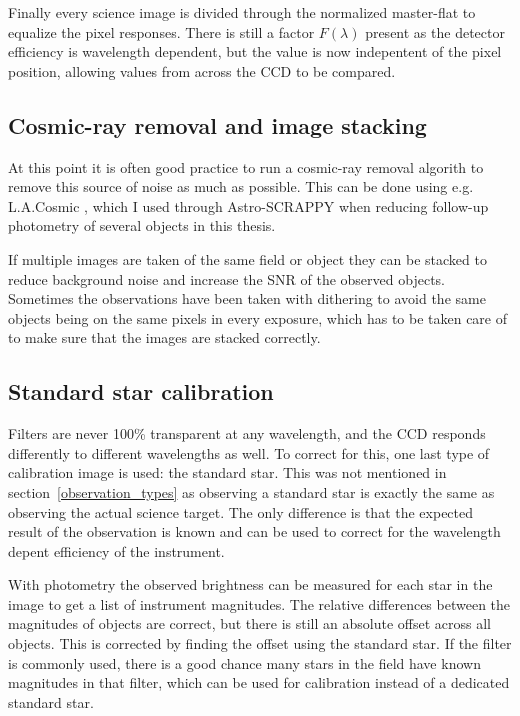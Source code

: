 \documentclass[a4paper,oneside,12pt, class=Latex/Classes/PhDthesisPSnPDF, crop=false]{standalone}
\begin{document}
Finally every science image is divided through the normalized master-flat to equalize the pixel responses. There is still a factor $F(\lambda)$ present as the detector efficiency is wavelength dependent, but the value is now indepentent of the pixel position, allowing values from across the CCD to be compared.

\subsection{Cosmic-ray removal and image stacking}
At this point it is often good practice to run a cosmic-ray removal algorith to remove this source of noise as much as possible. This can be done using e.g. L.A.Cosmic \citep{lacosmic}, which I used through Astro-SCRAPPY \citep{astroSCRAPPY} when reducing follow-up photometry of several objects in this thesis.

If multiple images are taken of the same field or object they can be stacked to reduce background noise and increase the SNR of the observed objects. Sometimes the observations have been taken with dithering to avoid the same objects being on the same pixels in every exposure, which has to be taken care of to make sure that the images are stacked correctly.

\subsection{Standard star calibration}
Filters are never 100\% transparent at any wavelength, and the CCD responds differently to different wavelengths as well. To correct for this, one last type of calibration image is used: the standard star. This was not mentioned in section~\ref{observation_types} as observing a standard star is exactly the same as observing the actual science target. The only difference is that the expected result of the observation is known and can be used to correct for the wavelength depent efficiency of the instrument.

With photometry the observed brightness can be measured for each star in the image to get a list of instrument magnitudes. The relative differences between the magnitudes of objects are correct, but there is still an absolute offset across all objects. This is corrected by finding the offset using the standard star. If the filter is commonly used, there is a good chance many stars in the field have known magnitudes in that filter, which can be used for calibration instead of a dedicated standard star.
\end{document}
